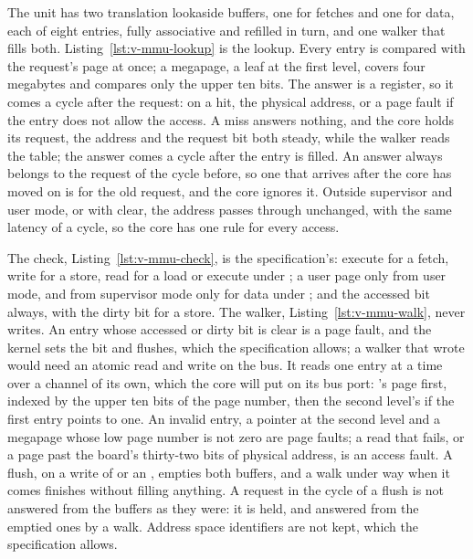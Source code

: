 \documentclass[journal,onecolumn,9pt]{IEEEtran}
\newcommand{\mmupart}[3]{%
}
\begin{document}
The unit has two translation lookaside buffers, one for fetches and one
for data, each of eight entries, fully associative and refilled in
turn, and one walker that fills both. Listing~\ref{lst:v-mmu-lookup}
is the lookup. Every entry is compared with the request's page at
once; a megapage, a leaf at the first level, covers four megabytes and
compares only the upper ten bits. The answer is a register, so it
comes a cycle after the request: on a hit, the physical address, or a
page fault if the entry does not allow the access. A miss answers
nothing, and the core holds its request, the address and the request
bit both steady, while the walker reads the table; the answer comes a
cycle after the entry is filled. An answer always belongs to the
request of the cycle before, so one that arrives after the core has
moved on is for the old request, and the core ignores it. Outside
supervisor and user mode, or with  clear, the address
passes through unchanged, with the same latency of a cycle, so the
core has one rule for every access.

The check, Listing~\ref{lst:v-mmu-check}, is the specification's:
execute for a fetch, write for a store, read for a load or execute
under ; a user page only from user mode, and from supervisor
mode only for data under ; and the accessed bit always, with
the dirty bit for a store. The walker, Listing~\ref{lst:v-mmu-walk},
never writes. An entry whose accessed or dirty bit is clear is a page
fault, and the kernel sets the bit and flushes, which the
specification allows; a walker that wrote would need an atomic read
and write on the bus. It reads one entry at a time over a channel of
its own, which the core will put on its bus port: 's page
first, indexed by the upper ten bits of the page number, then the
second level's if the first entry points to one. An invalid entry, a
pointer at the second level and a megapage whose low page number is
not zero are page faults; a read that fails, or a page past the
board's thirty-two bits of physical address, is an access fault.
A flush, on a write of  or an , empties
both buffers, and a walk under way when it comes finishes without
filling anything. A request in the cycle of a flush is not answered
from the buffers as they were: it is held, and answered from the
emptied ones by a walk. Address space identifiers are not kept, which the
specification allows.

\mmupart{lookup}{The lookup: every entry at once, and the answer in the
cycle.}{lst:v-mmu-lookup}
\end{document}
